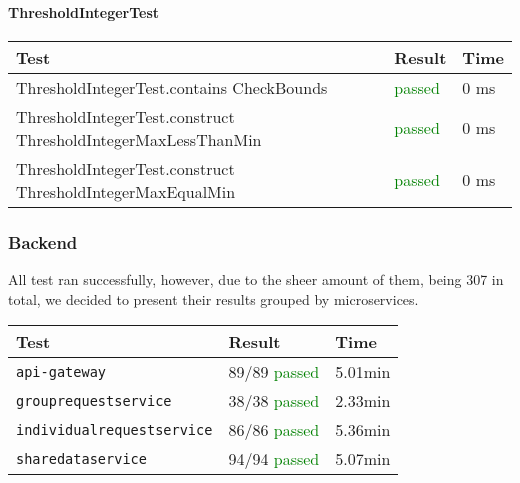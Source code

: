 \paragraph{ThresholdIntegerTest}

\begin{adjustwidth}{1cm}{}
        \begin{longtable}{|p{}|p{}|p{}|}
            \hline
            \textbf{Test} & \textbf{Result} & \textbf{Time} \\
            \hline
            ThresholdIntegerTest.contains CheckBounds & \textcolor{green}{passed} & 0 ms \\
            \hline 
            ThresholdIntegerTest.construct ThresholdIntegerMaxLessThanMin & \textcolor{green}{passed} & 0 ms \\
            \hline 
            ThresholdIntegerTest.construct ThresholdIntegerMaxEqualMin & \textcolor{green}{passed} & 0 ms \\
            \hline 
        
        \end{longtable}
    \end{adjustwidth}
    
\subsubsection{Backend}
All test ran successfully, however, due to the sheer amount of them, being 307 in total, we decided to present their results grouped by microservices.

\begin{adjustwidth}{1cm}{}
        \begin{longtable}{|p{}|p{}|p{}|}
            \hline
            \textbf{Test} & \textbf{Result} & \textbf{Time} \\
            \hline
            \texttt{api-gateway} & 89/89 \textcolor{green}{passed} & 5.01min \\
            \hline 
            \texttt{grouprequestservice} & 38/38 \textcolor{green}{passed} & 2.33min \\
            \hline 
           \texttt{individualrequestservice} & 86/86 \textcolor{green}{passed} & 5.36min \\
           \hline
           \texttt{sharedataservice} & 94/94 \textcolor{green}{passed} & 5.07min \\
           \hline 
        
        \end{longtable}
    \end{adjustwidth}